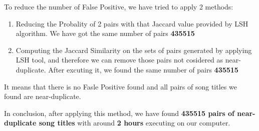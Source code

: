 \documentclass[10pt]{article}
\begin{document}
To reduce the number of False Positive, we have tried to apply 2 methods:

\begin{enumerate}
\item Reducing the Probality of 2 pairs with that Jaccard value provided by LSH algorithm. We have got the same number of pairs \textbf{435515}
\item Computing the Jaccard Similarity on the sets of pairs generated by applying LSH tool, and therefore we can remove those pairs not cosidered as near-duplicate. After excuting it, we found the same number of pairs \textbf{435515}
\end{enumerate}

It means that there is no Fasle Positive found and all pairs of song titles we found are near-duplicate.

In conclusion, after applying this method, we have found \textbf{435515 pairs of near-duplicate song titles} with around \textbf{2 hours} executing on our computer.
\end{document}
